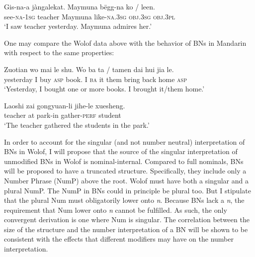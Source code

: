 \documentclass[output=paper]{langscibook}
\begin{document}
		\label{fon:bNnGaThHr}
		\z
		
		\ea 
	        \gll    Gis-na-a {j\`{a}ngalekat}. Maymuna b\"{e}gg-na ko / \minsp{*} leen.\\
			see-\textsc{na-1sg} teacher Maymuna like-\textsc{na.3sg} \textsc{obj.3sg} {} {} \textsc{obj.3pl}\\
			\glt    `I saw teacher yesterday. Maymuna admires her.'\label{fon:disKanFFf}
		\z
		
\noindent   One may compare the Wolof data above with the behavior of BNs in Mandarin with respect to the same properties:
			
    \ea \gll Zuotian wo mai le {shu}. Wo ba ta / tamen dai hui jia le.\\
		yesterday I buy \textsc{asp} book. I \textsc{ba} it {} them bring back home \textsc{asp}\\
		\glt    `Yesterday, I bought one or more books. I brought it/them home.'
	\z
		
	\ea \gll	Laoshi zai gongyuan-li jihe-le {xuesheng}.\\
			teacher at park-in gather-\textsc{perf} student\\
			\glt    `The teacher gathered the students in the park.'
	\z
		
In order to account for the singular (and not number neutral) interpretation of BNs in Wolof,  I will propose that the source of the singular interpretation of unmodified BNs in Wolof is nominal-internal. Compared to full nominals, BNs will be proposed to have a truncated structure. Specifically, they include only a Number Phrase (NumP) above the root. Wolof must have both a singular and a plural NumP. The NumP in BNs could in principle be plural too. But I stipulate that the plural Num must obligatorily lower onto \textit{n}. Because BNs lack a \textit{n}, the requirement that Num lower onto \textit{n} cannot be fulfilled. As such, the only convergent derivation is one where Num is singular. The correlation between the size of the structure and the number interpretation of a BN will be shown to be consistent with the effects that different modifiers may have on the number interpretation.
\end{document}
